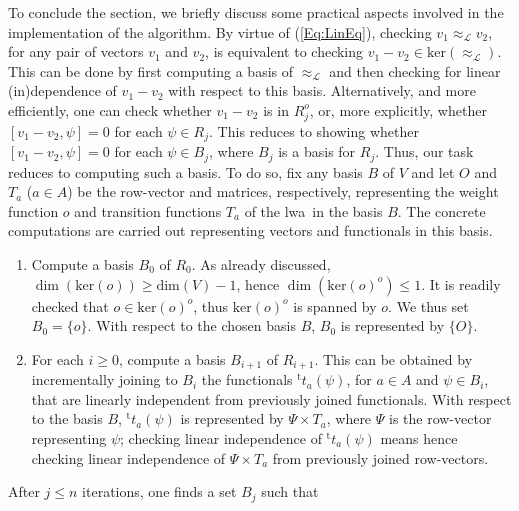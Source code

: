 \documentclass[3p]{elsarticle}
\newcommand{\fL}{\mathcal{L}}    %
\newcommand{\dimn}{\mathrm{dim}}   %
\newcommand{\transp}{{}^{\mathrm{t}}}  %
\newcommand{\ann}{o}                    %
\newcommand{\kernel}{\mathrm{ker}} %
\newcommand{\lwa}{{\sc lwa}}           %
\newcommand{\reals}{{\mathbb{R}}}              %
\begin{document}
To conclude the section, we briefly discuss some practical aspects
involved in the implementation of the algorithm. By virtue of
(\ref{Eq:LinEq}), checking $v_1\approx_\fL v_2$, for any pair of vectors
$v_1$ and $v_2$, is equivalent to checking $v_1-v_2\in
\kernel(\approx_\fL)$. This can be done by first computing a basis
of $\approx_\fL$ and then checking for linear (in)dependence of
$v_1-v_2$ with respect to this basis. Alternatively, and more efficiently, one
can check whether $v_1-v_2$ is in  $R_j^\ann$, or, more explicitly,
whether $[v_1-v_2,\psi]=0$ for each $\psi\in R_j$. This reduces to
showing whether $[v_1-v_2,\psi]=0$ for each $\psi\in B_j$, where
$B_j$ is a basis for $R_j$. Thus, our task reduces to computing
such a basis. To do so,   fix any   basis $B$ of $V$ and let $O$ and
$T_a$ ($a\in A$) be the row-vector and matrices, respectively, representing the
weight function $o$ and transition functions $T_a$ of the \lwa\  in the basis $B$. The
concrete computations are carried out representing vectors and
functionals in this basis.
\begin{enumerate}
\item Compute a basis $B_0$ of $R_0$. %
As already discussed, $\dim(\kernel(o))\geq \dimn(V)-1$, hence
$\dim(\kernel(o)^\ann)\leq 1$.
It is   readily checked that $o\in \kernel(o)^\ann$, thus
$\kernel(o)^\ann$  is spanned by   $o$. We thus   set $B_0=\{o\}$.
With respect to the chosen basis $B$, $B_0$ is represented by
$\{O\}$.

\item    For each $i\geq 0$, compute a basis $B_{i+1}$ of
$R_{i+1}  $. This can be obtained by    incrementally joining to
$B_i$ the functionals $\transp t_a (\psi)$, for $a\in A$ and
$\psi\in B_i$, that are linearly independent from previously joined
functionals. With respect to the basis $B$, $\transp t_a (\psi)$ is
represented by $\Psi \times T_a$, where $\Psi$ is the row-vector
representing $\psi$; checking linear independence of  $\transp t_a
(\psi)$ means hence checking linear independence of $\Psi \times
T_a$ from previously joined row-vectors.
\end{enumerate}
After   $j\leq n$ iterations, one finds a set $B_j$ such that
\end{document}
